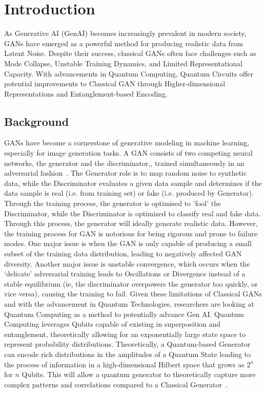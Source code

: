 \documentclass[conference]{IEEEtran}
\begin{document}
\section{Introduction}
As Generative AI (GenAI) becomes increasingly prevalent in modern society, GANs have emerged as a powerful method for producing realistic data from Latent Noise. Despite their success, classical GANs often face challenges such as Mode Collapse, Unstable Training Dynamics, and Limited Representational Capacity. With advancements in Quantum Computing, Quantum Circuits offer potential improvements to Classical GAN through Higher-dimensional Representations and Entanglement-based Encoding.

\subsection{Background}

GANs have become a cornerstone of generative modeling in machine learning, especially for image generation tasks. A GAN consists of two competing neural networks, the generator and the discriminator,, trained simultaneously in an adversarial fashion~\cite{b1}. The Generator role is to map random noise to synthetic data, while the Discriminator evaluates a given data sample and determines if the data sample is real (i.e. from training set) or fake (i.e. produced by Generator). Through the training process, the generator is optimised to 'fool' the Discriminator, while the Discriminator is optimized to classify real and fake data. Through this process, the generator will ideally generate realistic data.
However, the training process for GAN is notorious for being rigorous and prone to failure modes. One major issue is when the GAN is only capable of producing a small subset of the training data distribution, leading to negatively affected GAN diversity. Another major issue is unstable convergence, which occurs when the ‘delicate’ adversarial training leads to Oscillations or Divergence instead of a stable equilibrium (ie, the discriminator overpowers the generator too quickly, or vice versa), causing the training to fail.
Given these limitations of Classical GANs and with the advancement in Quantum Technologies, researchers are looking at Quantum Computing as a method to potentially advance Gen AI. Quantum Computing leverages Qubits capable of existing in superposition and entanglement, theoretically allowing for an exponentially large state space to represent probability distributions. Theoretically, a Quantum-based Generator can encode rich distributions in the amplitudes of a Quantum State leading to the process of information in a high-dimensional Hilbert space that grows as $2^n$ for $n$ Qubits. This will allow a quantum generator to theoretically capture more complex patterns and correlations compared to a Classical Generator~\cite{b2}.
\end{document}
